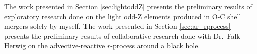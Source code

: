 \label{sec:additional_work}
\label{chapter:newsol}

The work presented in Section \ref{sec:lightoddZ} presents the preliminary results of exploratory research done on the light odd-Z elements produced in O-C shell mergers solely by myself.
The work presented in Section \ref{sec:ar_rprocess} presents the preliminary results of collaborative research done with Dr.\ Falk Herwig on the advective-reactive $r$-process around a black hole.



